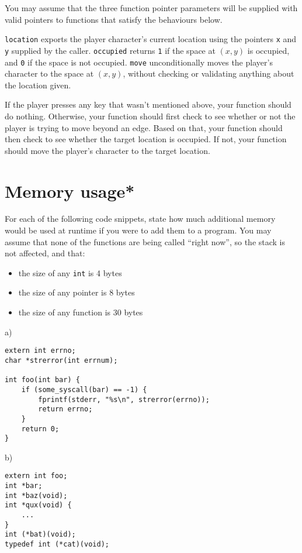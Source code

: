 \documentclass[a4paper,12pt]{article}
\begin{document}
You may assume that the three function pointer parameters will be
supplied with valid pointers to functions that satisfy the behaviours
below.

\texttt{location} exports the player character’s current location using
the pointers \texttt{x} and \texttt{y} supplied by the caller.
\texttt{occupied} returns \texttt{1} if the space at $(x, y)$ is
occupied, and \texttt{0} if the space is not occupied. \texttt{move}
unconditionally moves the player’s character to the space at $(x, y)$,
without checking or validating anything about the location given.

If the player presses any key that wasn’t mentioned above, your
function should do nothing. Otherwise, your function should first check
to see whether or not the player is trying to move beyond an edge.
Based on that, your function should then check to see whether the
target location is occupied. If not, your function should move the
player’s character to the target location.

\newpage

\section{Memory usage*}

For each of the following code snippets, state how much additional
memory would be used at runtime if you were to add them to a program.
You may assume that none of the functions are being called ``right
now'', so the stack is not affected, and that:

\begin{itemize}
	\item the size of any \texttt{int} is 4 bytes
	\item the size of any pointer is 8 bytes
	\item the size of any function is 30 bytes
\end{itemize}

a) %

\begin{lstlisting}
extern int errno;
char *strerror(int errnum);

int foo(int bar) {
	if (some_syscall(bar) == -1) {
		fprintf(stderr, "%s\n", strerror(errno));
		return errno;
	}
	return 0;
}
\end{lstlisting}

b) %

\begin{lstlisting}
extern int foo;
int *bar;
int *baz(void);
int *qux(void) {
	...
}
int (*bat)(void);
typedef int (*cat)(void);
\end{lstlisting}
\end{document}
